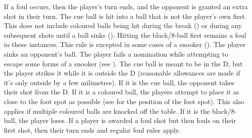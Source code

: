  If a foul occurs, then the player's turn ends, and the opponent is granted an extra shot in their turn.%
 {}%
 \FoulCircumstances%
\subruleitem The cue ball is hit into a ball that is not the player's own first. This does not include coloured balls being hit during the break () or during any subsequent shots until a ball sinks (). Hitting the black/8-ball first remains a foul in these instances. This rule is excepted in some cases of a snooker ().%
\subruleitem \CueBallMiss%
\subruleitem \CueBallSink%
\subruleitem The player sinks an opponent's ball.%
\subruleitem \CueBallRail%
\subruleitem \CueBallPreemptive%
\subruleitem The player fails a nomination while attempting to escape some forms of a snooker (see ).%
\subruleitem The cue ball is meant to be in the D, but the player strikes it while it is outside the D (reasonable allowances are made if it's only outside by a few milimetres).%
\subruleitem \PushShot%
\subruleitem {}%
\BallOffTable%
\subsubruleitem If it is the cue ball, the opponent takes their shot from the D.%
\subsubruleitem If it is a coloured ball, the players attempt to place it as close to the foot spot as possible (see  for the position of the foot spot). This also applies if multiple coloured balls are knocked off the table.%
\subsubruleitem If it is the black/8-ball, the player loses.%
\subruleitem \JumpShot%
\subruleitem \TableMovement%
\subruleitem {}%
 If a player is awarded a foul shot but then fouls on their first shot, then their turn ends and regular foul rules apply.%
%


